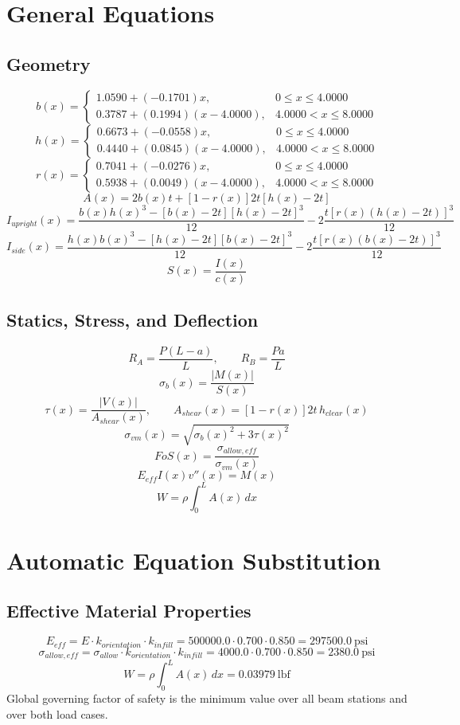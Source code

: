 \documentclass[11pt]{article}
\begin{document}
\section*{General Equations}
\subsection*{Geometry}
\[
b(x)=\begin{cases}1.0590 + (-0.1701)x, & 0 \le x \le 4.0000\\0.3787 + (0.1994)(x-4.0000), & 4.0000 < x \le 8.0000\end{cases}
\]
\[
h(x)=\begin{cases}0.6673 + (-0.0558)x, & 0 \le x \le 4.0000\\0.4440 + (0.0845)(x-4.0000), & 4.0000 < x \le 8.0000\end{cases}
\]
\[
r(x)=\begin{cases}0.7041 + (-0.0276)x, & 0 \le x \le 4.0000\\0.5938 + (0.0049)(x-4.0000), & 4.0000 < x \le 8.0000\end{cases}
\]
\[
A(x)=2b(x)t+[1-r(x)]2t[h(x)-2t]
\]
\[
I_{upright}(x)=\frac{b(x)h(x)^3-[b(x)-2t][h(x)-2t]^3}{12}-2\frac{t[r(x)(h(x)-2t)]^3}{12}
\]
\[
I_{side}(x)=\frac{h(x)b(x)^3-[h(x)-2t][b(x)-2t]^3}{12}-2\frac{t[r(x)(b(x)-2t)]^3}{12}
\]
\[
S(x)=\frac{I(x)}{c(x)}
\]

\subsection*{Statics, Stress, and Deflection}
\[
R_A=\frac{P(L-a)}{L}, \qquad R_B=\frac{Pa}{L}
\]
\[
\sigma_b(x)=\frac{|M(x)|}{S(x)}
\]
\[
\tau(x)=\frac{|V(x)|}{A_{shear}(x)}, \qquad A_{shear}(x)=[1-r(x)]2t\,h_{clear}(x)
\]
\[
\sigma_{vm}(x)=\sqrt{\sigma_b(x)^2+3\tau(x)^2}
\]
\[
FoS(x)=\frac{\sigma_{allow,eff}}{\sigma_{vm}(x)}
\]
\[
E_{eff}I(x)v''(x)=M(x)
\]
\[
W=\rho\int_0^L A(x)\,dx
\]

\section*{Automatic Equation Substitution}
\subsection*{Effective Material Properties}
\[E_{eff} = E \cdot k_{orientation} \cdot k_{infill} = 500000.0 \cdot 0.700 \cdot 0.850 = 297500.0\ \mathrm{psi}\]
\[\sigma_{allow,eff} = \sigma_{allow} \cdot k_{orientation} \cdot k_{infill} = 4000.0 \cdot 0.700 \cdot 0.850 = 2380.0\ \mathrm{psi}\]
\[W = \rho \int_0^L A(x)\,dx = 0.03979\ \mathrm{lbf}\]
Global governing factor of safety is the minimum value over all beam stations and over both load cases.
\end{document}

